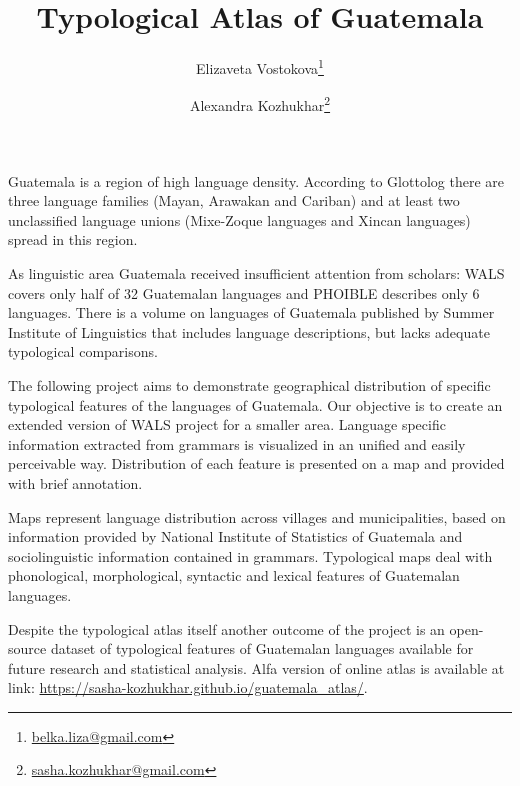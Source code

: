 \documentclass[12pt]{article}
\begin{document}
\title{Typological Atlas of Guatemala}
\author{Elizaveta Vostokova\thanks{\href{mailto:belka.liza@gmail.com}{belka.liza@gmail.com}}} 
\author{Alexandra Kozhukhar\thanks{\href{mailto:sasha.kozhukhar@gmail.com}{sasha.kozhukhar@gmail.com}}}
\date{}

\maketitle


Guatemala is a region of high language density. According to Glottolog
\cite{glottolog} there are three language families (Mayan, Arawakan and Cariban) and at least two unclassified language unions (Mixe-Zoque languages and Xincan languages) spread in this region. 
\smallskip{}

As linguistic area Guatemala received insufficient attention from scholars: WALS covers only half of 32 Guatemalan languages and PHOIBLE \cite{phoible} describes only 6 languages. There is a volume on languages of Guatemala \cite{mayers} published by Summer Institute of Linguistics that includes language descriptions, but lacks adequate typological comparisons.
\smallskip{}

The following project aims to demonstrate geographical distribution of specific typological features of the languages of Guatemala. Our objective is to create an extended version of WALS project \cite{wals} for a smaller area. Language specific information extracted from grammars is visualized in an unified and easily perceivable way. Distribution of each feature is presented on a map and provided with brief annotation.
\smallskip{}

Maps represent language distribution across villages and municipalities, based on information provided by National Institute of Statistics of Guatemala \cite{statistics} and sociolinguistic information contained in grammars. Typological maps deal with phonological, morphological, syntactic and lexical features of Guatemalan languages.
\smallskip{}

Despite the typological atlas itself another outcome of the project is an open-source dataset of typological features of Guatemalan languages available for future research and statistical analysis. Alfa version of online atlas is available at link: \href{https://sasha-kozhukhar.github.io/guatemala_atlas/}{https://sasha-kozhukhar.github.io/guatemala\_atlas/}.
\end{document}
